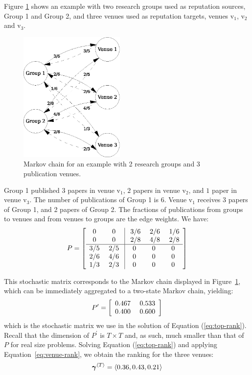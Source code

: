 \documentclass[notitlepage]{svjour3}
\begin{document}
Figure \ref{fig:ex1-MC} shows an example with two research groups used as reputation sources, Group 1 and Group 2, and three venues used as reputation targets, venues $\mbox{v}_1$, $\mbox{v}_2$ and $\mbox{v}_3$.
%
\begin{figure}[ht]
   \centerline{\includegraphics[width=5.2cm]{figures/models/bhrscore-w3}}
   \caption{Markov chain for an example with 2 research groups and 3 publication venues.}
   \label{fig:ex1-MC}
\end{figure}
%
Group 1 published $3$ papers in venue $\mbox{v}_1$, $2$ papers in venue $\mbox{v}_2$, and $1$ paper in venue $\mbox{v}_3$. The number of publications of Group 1 is $6$. Venue $\mbox{v}_1$ receives $3$ papers of Group 1, and 2 papers of Group 2. The fractions of publications from groups to venues and from venues to groups are the edge weights. We have:
\[
P =
\left[
\begin{array}{c c | c c c }
0            &0             & \  3/6 & \ 2/6     & \  1/6    \\
0            &0             & \  2/8 & \ 4/8     & \  2/8    \\
\hline
3/5        & \ {2/5\ }       &0         &0           &0       \\
2/6        & \ {4/6\ }       &0         &0           &0       \\
1/3        & \ {2/3\ }       &0         &0           &0       \\
\end{array}
\right]
\]

This stochastic matrix corresponds to the Markov chain displayed in Figure~\ref{fig:ex1-MC}, which can be immediately aggregated to a two-state Markov chain, yielding:
%
\[
P^\prime = 
\left[
\begin{array}{c c }
0.467   & \ 0.533 \\
0.400   & \ 0.600
\end{array}
\right]
\]
\noindent which is the stochastic matrix we use in the solution of Equation (\ref{eq:top-rank}). Recall that the dimension of $P^\prime$ is $T \times T$ and, as such, much smaller than that of $P$ for real size problems. Solving Equation (\ref{eq:top-rank}) and applying Equation~\eqref{eq:venue-rank}, we obtain the ranking for the three venues: 
\begin{equation}
{\mbox{\boldmath $\gamma$}}{^{\langle T \rangle}} = \langle 0.36, 0.43, 0.21 \rangle
\end{equation}
\end{document}
